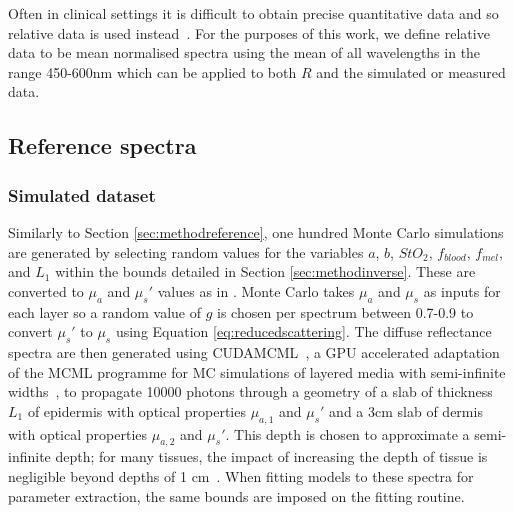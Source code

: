 Often in clinical settings it is difficult to obtain precise quantitative data and so relative data is used instead~\cite{Bahl2023}. For the
purposes of this work, we define relative data to be mean normalised spectra using the mean of all wavelengths in the range 450-600nm which can be applied to both $R$ and the simulated or measured data. 
%

\subsection{Reference spectra}\label{sec:methodreference2}
\subsubsection{Simulated dataset}
Similarly to Section \ref{sec:methodreference}, one hundred
Monte Carlo simulations are generated by selecting random values for the variables $a$, $b$, $StO_2$, $f_{blood}$, $f_{mel}$, and $L_1$ within the bounds detailed in Section \ref{sec:methodinverse}.
These are converted to $\mu_a$ and $\mu_s'$ values as in . Monte Carlo takes $\mu_a$ and $\mu_s$ as inputs for each layer so a random value of $g$ is chosen per spectrum between 0.7-0.9 to convert $\mu_s'$ to $\mu_s$ using Equation \eqref{eq:reducedscattering}. The diffuse reflectance spectra are then generated using CUDAMCML~\cite{Alerstam2008}, a GPU accelerated adaptation of the MCML programme for MC simulations of layered media with semi-infinite widths~\cite{Wang1995, Prahl1989}, to propagate 10000 photons through a geometry of a slab of thickness $L_1$ of epidermis with optical properties $\mu_{a,1}$ and $\mu_s'$ and a 3cm slab of dermis with optical properties $\mu_{a, 2}$ and $\mu_s'$. This depth is chosen to approximate a semi-infinite depth; for many tissues, the impact of increasing the depth of tissue is negligible beyond depths of 1 cm~\cite{Zhang2014}. When fitting models to these spectra for parameter extraction, the same bounds are imposed on the fitting routine. 

